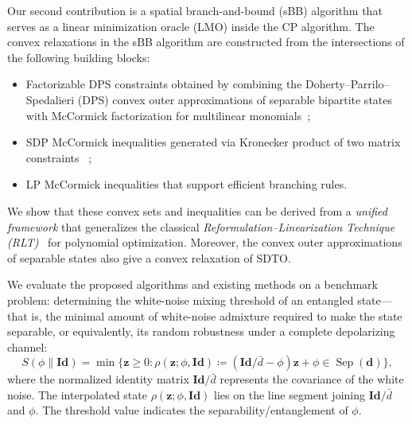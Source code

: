 \documentclass[smallextended]{svjour3}
\DeclareMathOperator{\sep}{Sep}
\newcommand{\1}{\mathbf{1}}
\newcommand{\z}{\mathbf{z}}
\newcommand{\Id}{\mathbf{Id}}
\newcommand{\vc}[1]{\mathbf{#1}}
\newcommand{\vd}{\vc{d}}
\newcommand{\deq}{\coloneqq}
\begin{document}
Our second contribution is a spatial branch-and-bound (sBB) algorithm that serves as a linear minimization oracle (LMO) inside the CP algorithm. The convex relaxations in the sBB algorithm are constructed from the intersections of the following building blocks:
\begin{itemize}
    \item Factorizable DPS constraints obtained by combining the Doherty--Parrilo--Spedalieri (DPS) convex outer approximations of separable bipartite states   \cite{doherty2004complete} with McCormick factorization for multilinear monomials~\cite{al1983jointly};
    \item SDP McCormick inequalities generated via Kronecker product of two matrix constraints  ~\cite{anstreicher2017kronecker};
    \item LP McCormick inequalities that support efficient branching rules.
\end{itemize}
We show that these convex sets and inequalities can be derived from a \textit{unified framework} that generalizes the classical \textit{Reformulation--Linearization Technique (RLT)}~\cite{sherali1992global} for polynomial optimization. Moreover, the convex outer approximations of separable states  also give a convex relaxation of SDTO.

We evaluate the proposed algorithms and existing methods   on a benchmark problem: determining the white-noise mixing threshold  of an entangled state—that is, the minimal amount of white-noise admixture required to make the state separable, or equivalently, its random robustness \cite{Vidal1999robustness} under a complete depolarizing channel:
\begin{equation}
    \label{eq.thre} \tag{Threshold}
    S(\phi\|\Id) =  \min \{\z \ge 0: \rho(\z; \phi,\Id) \deq (\Id / \bar{d}-\phi)\z +  \phi \in \sep(\vd)\},
\end{equation}
where the normalized  identity matrix $\Id/ \bar{d}$ represents the  covariance of the white noise. The interpolated state $\rho(\z; \phi, \Id)$ lies on the line segment joining $\Id/\bar{d}$ and $\phi$. The threshold value indicates the separability/entanglement of $\phi$.
\end{document}
